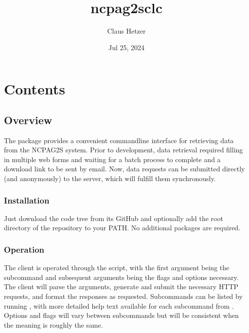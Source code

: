 \documentclass[letterpaper,10pt,english]{sphinxmanual}
\title{ncpag2s\sphinxhyphen{}clc}
\date{Jul 25, 2024}
\author{Claus Hetzer}
\begin{document}
\pagestyle{empty}
\sphinxmaketitle
\pagestyle{plain}
\sphinxtableofcontents
\pagestyle{normal}
\label{\detokenize{index::doc}}



\chapter{Contents}
\label{\detokenize{index:contents}}

\section{Overview}
\label{\detokenize{overview:overview}}\label{\detokenize{overview:id1}}\label{\detokenize{overview::doc}}
\sphinxAtStartPar
The  package provides a convenient command\sphinxhyphen{}line interface for retrieving data from the NCPA\sphinxhyphen{}G2S system.  Prior to development, data retrieval required filling in multiple web forms and waiting for a batch process to complete and a download link to be sent by email.  Now, data requests can be submitted directly (and anonymously) to the server, which will fulfill them synchronously.


\subsection{Installation}
\label{\detokenize{overview:installation}}
\sphinxAtStartPar
Just download the code tree from its GitHub  and optionally add the root directory of the repository to your PATH. No additional packages are required.


\subsection{Operation}
\label{\detokenize{overview:operation}}
\sphinxAtStartPar
The client is operated through the  script, with the first argument being the subcommand and subsequent arguments being the flags and options necessary. The client will parse the arguments, generate and submit the necessary HTTP requests, and format the responses as requested.  Subcommands can be listed by running , with more detailed help text available for each subcommand from .  Options and flags will vary between subcommands but will be consistent when the meaning is roughly the same.
\end{document}
